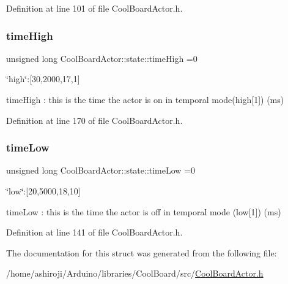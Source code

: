 Definition at line 101 of file Cool\+Board\+Actor.\+h.

\mbox{\label{struct_cool_board_actor_1_1state_a54cd4976b56aeaa6274fe0576aaebb0f}} 
\subsubsection{\texorpdfstring{time\+High}{timeHigh}}
{\footnotesize\ttfamily unsigned long Cool\+Board\+Actor\+::state\+::time\+High =0}

\char`\"{}high\char`\"{}\+:\mbox{[}30,2000,17,1\mbox{]}

time\+High \+: this is the time the actor is on in temporal mode(high\mbox{[}1\mbox{]}) (ms) 

Definition at line 170 of file Cool\+Board\+Actor.\+h.

\mbox{\label{struct_cool_board_actor_1_1state_a314c53c146e8c7b12c025323a34fbb9a}} 
\subsubsection{\texorpdfstring{time\+Low}{timeLow}}
{\footnotesize\ttfamily unsigned long Cool\+Board\+Actor\+::state\+::time\+Low =0}

\char`\"{}low\char`\"{}\+:\mbox{[}20,5000,18,10\mbox{]}

time\+Low \+: this is the time the actor is off in temporal mode (low\mbox{[}1\mbox{]}) (ms) 

Definition at line 141 of file Cool\+Board\+Actor.\+h.



The documentation for this struct was generated from the following file\+:\begin{DoxyCompactItemize}
\item 
/home/ashiroji/\+Arduino/libraries/\+Cool\+Board/src/\hyperlink{_cool_board_actor_8h}{Cool\+Board\+Actor.\+h}\end{DoxyCompactItemize}
